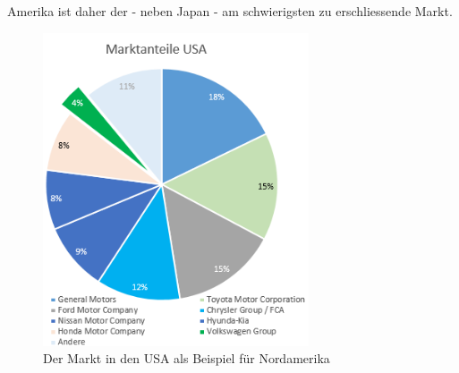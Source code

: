 \documentclass[12pt]{article}
\begin{document}
Amerika ist daher der - neben Japan - am schwierigsten zu erschliessende Markt.
\begin{figure}[here!]
\centering
\includegraphics[width=0.7\textwidth]{images/maam}
\caption{Der Markt in den USA als Beispiel für Nordamerika}
\label{fig:marktnordamerika}
\end{figure}\FloatBarrier
\noindent
\end{document}
